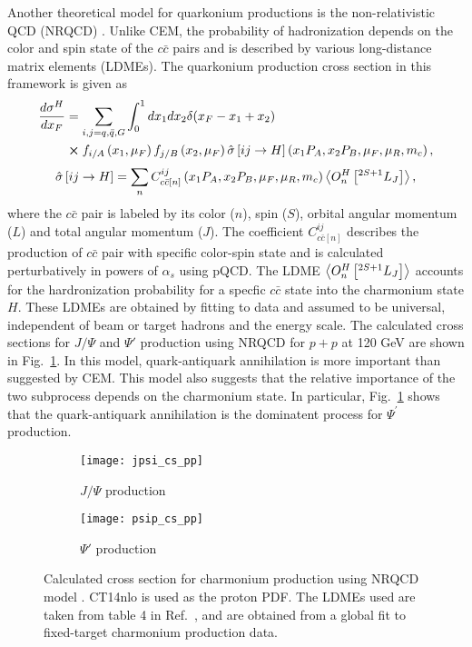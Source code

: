 Another theoretical model for quarkonium productions is the non-relativistic 
QCD (NRQCD) \cite{bodwin1995,bodwin1997}. Unlike CEM, the probability of 
hadronization depends on the color and spin state of the $c\bar{c}$ pairs and 
is described by various long-distance matrix elements (LDMEs). The quarkonium 
production cross section in this framework is given as
\begin{equation}
    \begin{split}
        \frac{d\sigma^H}{dx_F} &=\sum_{i,j = q,\bar{q},G}\int^1_0 dx_1 dx_2 \delta(x_F-x_1+x_2)\\
        &\cross f_{i/A}\left(x_1,\mu_F\right)f_{j/B}\left(x_2,\mu_F\right)\hat{\sigma}\left[ij\rightarrow H\right]\left(x_1P_A,x_2P_B,\mu_F,\mu_R , m_c\right),
    \end{split}
\end{equation}
\begin{equation}
    \hat{\sigma}\left[ij\rightarrow H\right]= \sum_n C^{ij}_{c\bar{c}\left[n\right]}\left(x_1P_A,x_2P_B,\mu_F,\mu_R , m_c\right)\expval{O^H_n \left[^{2S+1}L_J\right]},
\end{equation}
where the $c\bar{c}$ pair is labeled by its color ($n$), spin ($S$), orbital 
angular momentum ($L$) and total angular momentum ($J$). The coefficient 
$C^{ij}_{c\bar{c}\left[n\right]}$ describes the production of $c\bar{c}$ pair 
with specific color-spin state and is calculated perturbatively in powers of 
$\alpha_s$ using pQCD. The LDME $\expval{O^H_n \left[^{2S+1}L_J\right]}$ accounts 
for the hardronization probability for a specfic $c\bar{c}$ state into the 
charmonium state $H$. These LDMEs are obtained by fitting to data and assumed to
be universal, independent of beam or target hadrons and the energy scale. The 
calculated cross sections for $J/\Psi$ and $\Psi'$ production using NRQCD for 
$p+p$ at 120 GeV are shown in Fig.\ \ref{fig:NRQCD_cs}. In this model, quark-antiquark
annihilation is more important than suggested by CEM. This model also suggests 
that the relative importance of the two subprocess depends on the charmonium state. 
In particular, Fig.\ \ref{fig:NRQCD_cs} shows that the quark-antiquark annihilation 
is the dominatent process for $\Psi^\prime$ production.
\begin{figure}[h!]
    \centering
    \begin{subfigure}{0.45\linewidth}
    \texttt{[image: jpsi\_cs\_pp]}
    \caption{$J/\Psi$ production}
    \end{subfigure}
    \quad
    \begin{subfigure}{0.45\linewidth}
    \texttt{[image: psip\_cs\_pp]}
    \caption{$\Psi'$ production}
    \end{subfigure}
    \caption{Calculated cross section for charmonium production using NRQCD model
		\cite{chang2021}. CT14nlo is used as the proton PDF. The LDMEs used are
		taken from table \num{4} in Ref.\ \cite{hsieh2021}, and are obtained from a 
		global fit to fixed-target charmonium production data. }
    \label{fig:NRQCD_cs}
\end{figure}


